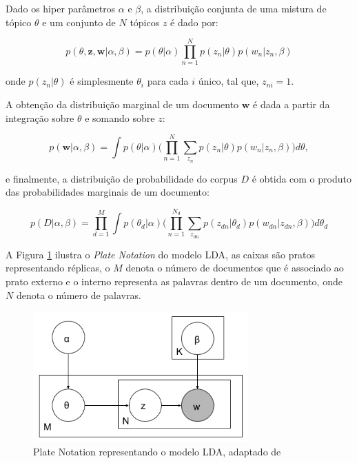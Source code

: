 \documentclass[12pt,a4paper]{article}
\begin{document}
Dado os hiper parâmetros $\alpha$ e $\beta$, a distribuição conjunta de uma mistura de tópico $\theta$ e um conjunto de $N$ tópicos $z$ é dado por:

\begin{equation}
p(\theta,\textbf{z},\textbf{w}|\alpha,\beta) = p(\theta|\alpha) \prod_{n=1}^{N} p(z_n|\theta)p(w_n|z_n,\beta)
\end{equation}

onde $p(z_n | \theta)$ é simplesmente $\theta _i$ para cada $i$ único,
 tal que, $z_{ni}=1$.
 
A obtenção da distribuição marginal de um documento $\textbf{w}$ é dada a partir da integração sobre $\theta$ e somando sobre $z$:

\begin{equation}
p(\textbf{w}|\alpha,\beta)=\int{p(\theta|\alpha)\Bigg(\prod_{n=1}^{N}\sum_{z_n} p(z_n|\theta)p(w_n|z_n,\beta)\Bigg)d\theta},
\end{equation}

e finalmente, a distribuição de probabilidade do corpus $D$ é obtida com o produto das probabilidades marginais de um documento:

\begin{equation}
p(D|\alpha,\beta)= \prod_{d=1}^{M} \int{p(\theta _d|\alpha)\Bigg(\prod_{n=1}^{N_d}\sum_{z_{dn}} p(z_{dn}|\theta _d)p(w_{dn}|z_{dn},\beta)\Bigg)d\theta _d}
\end{equation}


A Figura \ref{fig-plate} ilustra o 	\textit{Plate Notation} do modelo LDA, as caixas são pratos representando réplicas,
o $M$ denota o número de documentos que é associado ao prato externo e o interno representa as palavras dentro de um documento, onde $N$ denota o número de palavras.

\begin{figure}[H]
 \centering
   \includegraphics[height=5cm]{images/figure_1.png}
   \caption{Plate Notation representando o modelo LDA, adaptado de }
   \label{fig-plate}
\end{figure}
\end{document}
